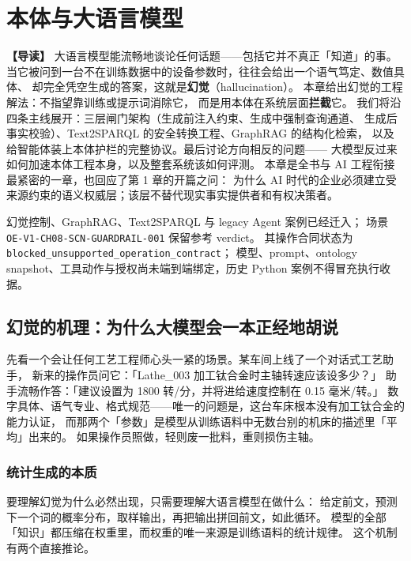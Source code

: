 \chapter{本体与大语言模型}

\begin{introbox}
\textbf{【导读】}
大语言模型能流畅地谈论任何话题——包括它并不真正「知道」的事。
当它被问到一台不在训练数据中的设备参数时，往往会给出一个语气笃定、数值具体、
却完全凭空生成的答案，这就是\textbf{幻觉}（hallucination）。
本章给出幻觉的工程解法：不指望靠训练或提示词消除它，
而是用本体在系统层面\textbf{拦截}它。
我们将沿四条主线展开：三层闸门架构（生成前注入约束、生成中强制查询通道、
生成后事实校验）、Text2SPARQL 的安全转换工程、GraphRAG 的结构化检索，
以及给智能体装上本体护栏的完整协议。最后讨论方向相反的问题——
大模型反过来如何加速本体工程本身，以及整套系统该如何评测。
本章是全书与 AI 工程衔接最紧密的一章，也回应了第 1 章的开篇之问：
为什么 AI 时代的企业必须建立受来源约束的语义权威层；该层不替代现实事实提供者和有权决策者。
\end{introbox}

{幻觉控制、GraphRAG、Text2SPARQL 与 legacy Agent 案例已经迁入；
场景 \texttt{OE-V1-CH08-SCN-GUARDRAIL-001} 保留参考 verdict。}
{其操作合同状态为 \texttt{blocked\_unsupported\_operation\_contract}；
模型、prompt、ontology snapshot、工具动作与授权尚未端到端绑定，历史 Python 案例不得冒充执行收据。}

\section{幻觉的机理：为什么大模型会一本正经地胡说}

先看一个会让任何工艺工程师心头一紧的场景。某车间上线了一个对话式工艺助手，
新来的操作员问它：「Lathe\_003 加工钛合金时主轴转速应该设多少？」
助手流畅作答：「建议设置为 1800 转/分，并将进给速度控制在 0.15 毫米/转。」
数字具体、语气专业、格式规范——唯一的问题是，这台车床根本没有加工钛合金的能力认证，
而那两个「参数」是模型从训练语料中无数台别的机床的描述里「平均」出来的。
如果操作员照做，轻则废一批料，重则损伤主轴。

\subsection{统计生成的本质}

要理解幻觉为什么必然出现，只需要理解大语言模型在做什么：
给定前文，预测下一个词的概率分布，取样输出，再把输出拼回前文，如此循环。
模型的全部「知识」都压缩在权重里，而权重的唯一来源是训练语料的统计规律。
这个机制有两个直接推论。

